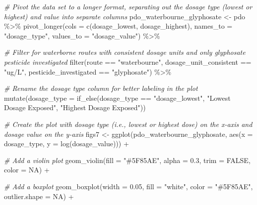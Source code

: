 \documentclass[
]{article}
\newenvironment{Shaded}{\begin{snugshade}}{\end{snugshade}}
\newcommand{\AttributeTok}[1]{\textcolor[rgb]{0.77,0.63,0.00}{#1}}
\newcommand{\CommentTok}[1]{\textcolor[rgb]{0.56,0.35,0.01}{\textit{#1}}}
\newcommand{\ConstantTok}[1]{\textcolor[rgb]{0.00,0.00,0.00}{#1}}
\newcommand{\FloatTok}[1]{\textcolor[rgb]{0.00,0.00,0.81}{#1}}
\newcommand{\FunctionTok}[1]{\textcolor[rgb]{0.00,0.00,0.00}{#1}}
\newcommand{\NormalTok}[1]{#1}
\newcommand{\OtherTok}[1]{\textcolor[rgb]{0.56,0.35,0.01}{#1}}
\newcommand{\SpecialCharTok}[1]{\textcolor[rgb]{0.00,0.00,0.00}{#1}}
\newcommand{\StringTok}[1]{\textcolor[rgb]{0.31,0.60,0.02}{#1}}
\begin{document}
\begin{Shaded}
\begin{Highlighting}[]
\CommentTok{\# Pivot the data set to a longer format, separating out the dosage type (lowest or highest) and value into separate columns}
\NormalTok{pdo\_waterbourne\_glyphosate }\OtherTok{\textless{}{-}}\NormalTok{ pdo }\SpecialCharTok{\%\textgreater{}\%}
  \FunctionTok{pivot\_longer}\NormalTok{(}\AttributeTok{cols =} \FunctionTok{c}\NormalTok{(dosage\_lowest, dosage\_highest), }
               \AttributeTok{names\_to =} \StringTok{"dosage\_type"}\NormalTok{,}
               \AttributeTok{values\_to =} \StringTok{"dosage\_value"}\NormalTok{) }\SpecialCharTok{\%\textgreater{}\%} 
  
  \CommentTok{\# Filter for waterborne routes with consistent dosage units and only glyphosate pesticide investigated}
  \FunctionTok{filter}\NormalTok{(route }\SpecialCharTok{==} \StringTok{"waterbourne"}\NormalTok{, dosage\_unit\_consistent }\SpecialCharTok{==} \StringTok{"ug/L"}\NormalTok{, pesticide\_investigated }\SpecialCharTok{==} \StringTok{"glyphosate"}\NormalTok{) }\SpecialCharTok{\%\textgreater{}\%}  
  
  \CommentTok{\# Rename the dosage type column for better labeling in the plot}
  \FunctionTok{mutate}\NormalTok{(}\AttributeTok{dosage\_type =} \FunctionTok{if\_else}\NormalTok{(dosage\_type }\SpecialCharTok{==} \StringTok{"dosage\_lowest"}\NormalTok{, }\StringTok{"Lowest Dosage Exposed"}\NormalTok{, }\StringTok{"Highest Dosage Exposed"}\NormalTok{))}


\CommentTok{\# Create the plot with dosage type (i.e., lowest or highest dose) on the x{-}axis and dosage value on the y{-}axis}
\NormalTok{figs7 }\OtherTok{\textless{}{-}} \FunctionTok{ggplot}\NormalTok{(pdo\_waterbourne\_glyphosate, }\FunctionTok{aes}\NormalTok{(}\AttributeTok{x =}\NormalTok{ dosage\_type, }\AttributeTok{y =} \FunctionTok{log}\NormalTok{(dosage\_value))) }\SpecialCharTok{+}
  
  \CommentTok{\# Add a violin plot}
 \FunctionTok{geom\_violin}\NormalTok{(}\AttributeTok{fill =} \StringTok{"\#5F85AE"}\NormalTok{, }\AttributeTok{alpha =} \FloatTok{0.3}\NormalTok{, }\AttributeTok{trim =} \ConstantTok{FALSE}\NormalTok{, }\AttributeTok{color =} \ConstantTok{NA}\NormalTok{) }\SpecialCharTok{+}
  
  \CommentTok{\# Add a boxplot}
  \FunctionTok{geom\_boxplot}\NormalTok{(}\AttributeTok{width =} \FloatTok{0.05}\NormalTok{, }\AttributeTok{fill =} \StringTok{"white"}\NormalTok{, }\AttributeTok{color =} \StringTok{"\#5F85AE"}\NormalTok{, }\AttributeTok{outlier.shape =} \ConstantTok{NA}\NormalTok{) }\SpecialCharTok{+}
  

\end{Highlighting}
\end{Shaded}
\end{document}
